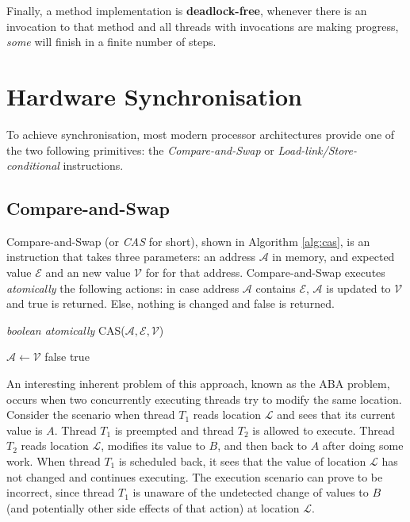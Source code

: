 Finally, a method implementation is \textbf{deadlock-free}, whenever there is an invocation to that method and all threads with invocations are making progress, \textit{some} will finish in a finite number of steps\cite{book}.

\section{Hardware Synchronisation}
\label{subsection:sync}
To achieve synchronisation, most modern processor architectures provide one of the two following primitives: the \textit{Compare-and-Swap} or \textit{Load-link/Store-conditional} instructions.

\subsection{Compare-and-Swap}
Compare-and-Swap (or \textit{CAS} for short), shown in Algorithm \ref{alg:cas}, is an instruction that takes three parameters: an address $\mathcal{A}$ in memory, and expected value $\mathcal{E}$ and an new value $\mathcal{V}$ for for that address. Compare-and-Swap executes \textit{atomically} the following actions: in case address $\mathcal{A}$ contains $\mathcal{E}$, $\mathcal{A}$ is updated to $\mathcal{V}$ and true is returned. Else, nothing is changed and false is returned. 

\begin{algorithm}
\label{alg:cas}
\caption{\textit{boolean atomically} CAS($\mathcal{A}, \mathcal{E}, \mathcal{V}$)}
\begin{algorithmic}[1]
        \State *$\mathcal{A} \gets \mathcal{V}$
    \Else
        \State \Return false
    \EndIf
    \State \Return true
\end{algorithmic}
\end{algorithm}

An interesting inherent problem of this approach, known as the ABA problem, occurs when two concurrently executing threads try to modify the same location. Consider the scenario when thread $T_1$ reads location $\mathcal{L}$ and sees that its current value is $A$. Thread $T_1$ is preempted and thread $T_2$ is allowed to execute. Thread $T_2$ reads location $\mathcal{L}$, modifies its value to $B$, and then back to $A$ after doing some work. When thread $T_1$ is scheduled back, it sees that the value of location $\mathcal{L}$ has not changed and continues executing. The execution scenario can prove to be incorrect, since thread $T_1$ is unaware of the undetected change of values to $B$ (and potentially other side effects of that action) at location $\mathcal{L}$.
 
